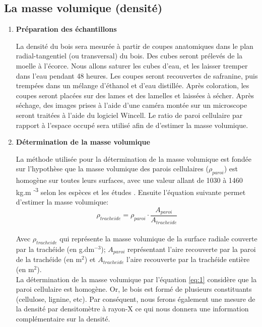 \documentclass[a4paper,12pt]{report}
\begin{document}
\subsection*{La masse volumique (densité)}

\begin{enumerate}
	 

\item \textbf{Préparation des échantillons}

La densité du bois sera mesurée à partir de coupes anatomiques dans le plan radial-tangentiel (ou transversal) du bois. Des cubes seront prélevés de la moelle à l'écorce. Nous allons saturer les cubes d'eau, et les laisser tremper dans l'eau pendant 48 heures. Les coupes seront recouvertes de safranine, puis trempées dans un mélange d'éthanol et d'eau distillée. Après coloration, les coupes seront placées sur des lames et des lamelles et laissées à sécher. Après séchage, des images prises à l'aide d'une caméra montée sur un microscope seront traitées à l'aide du logiciel Wincell. Le ratio de paroi cellulaire par rapport à l'espace occupé sera utilisé afin de d'estimer la masse volumique. \\

\item \textbf{Détermination de la masse volumique}

La méthode utilisée pour la détermination de la masse volumique est fondée sur l'hypothèse que la masse volumique des parois cellulaires ($\rho_{paroi}$) est homogène sur toutes leurs surfaces, avec une valeur allant de 1030 à 1460 kg.m \textsuperscript{-3} selon les espèces et les études \citep{Decoux2004}. Ensuite l'équation suivante permet d'estimer la masse volumique: \\

\begin{equation}\label{eq:1}
\rho_{tracheide} = \rho_{paroi}\cdot\frac{A_{paroi}}{A_{tracheide}}
\end{equation}\\

Avec $\rho_{tracheide}$ qui représente la masse volumique de la surface radiale couverte par la trachéide (en g.dm$^{-3}$); $A_{paroi}$ représentant l'aire recouverte par la paroi de la trachéide (en m$^{2}$) et $A_{tracheide}$ l'aire recouverte par la trachéide entière (en m$^{2}$).\\

La détermination de la masse volumique par l'équation \ref{eq:1} considère que la paroi cellulaire est homogène. Or, le bois est formé de plusieurs constituants (cellulose, lignine, etc). Par conséquent, nous ferons également une mesure de la densité par densitomètre à rayon-X ce qui nous donnera une information complémentaire sur la densité.
\end{enumerate}
\end{document}
